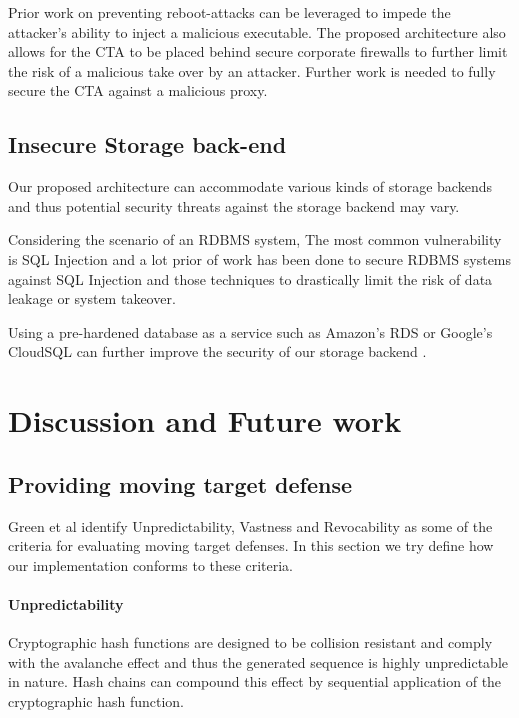 \documentclass[a4paper,twoside]{article}
\begin{document}
Prior work \cite{libert_tracing_2008, mccune_flicker:_2008} on preventing reboot-attacks can be leveraged to impede the attacker's ability to inject a malicious executable. The proposed architecture also allows for the CTA to be placed behind secure corporate firewalls to further limit the risk of a malicious take over by an attacker. Further work is needed to fully secure the CTA against a malicious proxy.

\subsection{Insecure Storage back-end}

Our proposed architecture can accommodate various kinds of storage backends and thus potential security threats against the storage backend may vary. 

Considering the scenario of an RDBMS system, The most common vulnerability is SQL Injection and a lot prior of work has been done to secure RDBMS systems against SQL Injection \cite{halfond_amnesia:_2005, boyd_sqlrand:_2004, halfond_classification_2006} and those techniques to drastically limit the risk of data leakage or system takeover.

Using a pre-hardened database as a service such as Amazon's RDS or Google's CloudSQL can further improve the security of our storage backend \cite{curino_relational_2011} .

\section{Discussion and Future work}
\label{sec:future}
\subsection{Providing moving target defense}

Green et al \cite{green_characterizing_2015} identify Unpredictability, Vastness and Revocability as some of the criteria for evaluating moving target defenses. In this section we try define how our implementation conforms to these criteria.

\paragraph*{Unpredictability} Cryptographic hash functions \cite{rogaway_cryptographic_2004} are designed to be collision resistant and comply with the avalanche effect and thus the generated sequence is highly unpredictable in nature. Hash chains can compound this effect by sequential application of the cryptographic hash function.
\end{document}
